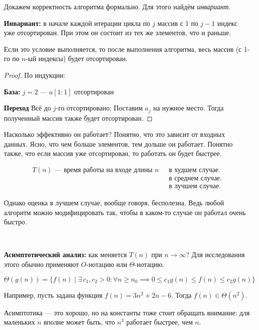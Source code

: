 ﻿\documentclass[12pt,a4paper]{article}
\begin{document}
Докажем корректность алгоритма формально. Для этого найдём \emph{инвариант}.

\textbf{Инвариант:} в начале каждой итерации цикла по $j$ массив с 1 по $j-1$ индекс уже отсортирован. При этом он состоит из тех же элементов, что и раньше.

Если это условие выполняется, то после выполнения алгоритма, весь массив (с 1-го по $n$-ый индексы) будет отсортирован.

\begin{proof} По индукции:

\textbf{База:} $j=2$ --- $a[1:1]$ отсортирован

\textbf{Переход} Всё до $j$-го отсортировано; Поставим $a_j$ на нужное место. Тогда полученный массив также будет отсортирован.
\end{proof}
Насколько эффективно он работает?  Понятно, что это зависит от входных данных. Ясно, что чем больше элементов, тем дольше он работает.
Понятно также, что если массив уже отсортирован, то работать он будет быстрее.

\begin{align}
    \text{$T(n)$ --- время работы на входе длины $n$ }&\text{в худшем случае.}\\
    &\text{в среднем случае.} \\
    &\text{в лучшем случае.}
\end{align}

Однако оценка в лучшем случае, вообще говоря, бесполезна. Ведь любой алгоритм можно модифицировать так, чтобы в каком-то случае он работал очень быстро.

\

\textbf{Асимптотический анализ:} как меняется $T(n)$ при $n\to \infty$? Для исследования этого обычно применяют $O$-нотацию или $\Theta$-нотацию.

\[\Theta(g(n)) = \{f(n)\mid\exists\,c_1, c_2 > 0: \forall n\geqslant n_0 \implies 0 \leqslant c_1g(n) \leqslant f(n) \leqslant c_2g(n)\}\]

Например, пусть задана функция $f(n) = 3n^2 + 2n - 6$. Тогда $f(n) \in \Theta(n^2)$.

Асимптотика --- это хорошо, но на константы тоже стоит обращать внимание: для маленьких $n$ вполне может быть, что $n^3$ работает быстрее, чем $n$.

\begin{center}
\end{center}
\end{document}
